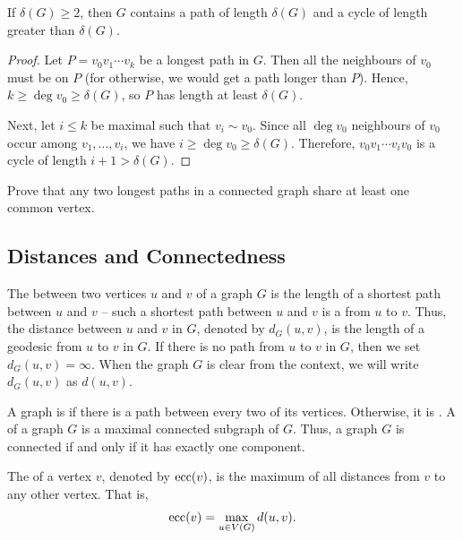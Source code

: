 \begin{Theorem}\label{thm:deltaGPath}
If $\delta(G) \ge 2$, then $G$ contains a path of length $\delta(G)$ and a cycle of length greater than $\delta(G)$.
\end{Theorem}

\begin{proof}
Let $P = v_0 v_1 \cdots v_k$ be a longest path in $G$. Then all the neighbours of $v_0$ must be on $P$ (for otherwise, we would get a path longer than $P$). Hence, $k \ge \deg v_0 \ge \delta(G)$, so $P$ has length at least $\delta(G)$.

Next, let $i \le k$ be maximal such that $v_i \sim v_0$. Since all $\deg v_0$ neighbours of $v_0$ occur among $v_1,\ldots,v_i$, we have $i \ge \deg v_0 \ge \delta(G)$. Therefore, $v_0 v_1 \cdots v_i v_0$ is a cycle of length $i + 1 > \delta(G)$.
\end{proof}

\begin{Exercise}
Prove that any two longest paths in a connected graph share at least one common vertex.
\end{Exercise}

\subsection{Distances and Connectedness}\label{subsec:DistancesConnectedness}

The  between two vertices $u$ and $v$ of a graph $G$ is the length of a shortest path between $u$ and $v$ -- such a shortest path between $u$ and $v$ is a  from $u$ to $v$. Thus, the distance between $u$ and $v$ in $G$, denoted by $d_G(u, v)$, is the length of a geodesic from $u$ to $v$ in $G$. If there is no path from $u$ to $v$ in $G$, then we set $d_G(u, v) = \infty$. When the graph $G$ is clear from the context, we will write $d_G(u, v)$ as $d(u, v)$.

A graph is  if there is a path between every two of its vertices. Otherwise, it is . A  of a graph $G$ is a maximal connected subgraph of $G$. Thus, a graph $G$ is connected if and only if it has exactly one component.

The  of a vertex $v$, denoted by $\operatorname{ecc}(v)$, is the maximum of all distances from $v$ to any other vertex. That is,
\begin{equation*}
    \operatorname{ecc}(v) = \max_{u \in V(G)} d(u, v) .
\end{equation*}

